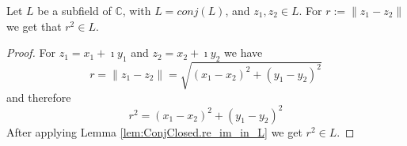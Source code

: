 \begin{lemma}
    \label{lem:ConjClosed.distSq_L}
    \leanok
    Let $L$ be a subfield of $\mathbb{C}$, with $L = conj(L)$, and $z_1, z_2 \in L$.
    For $r := \|z_1-z_2\|$ we get that $r^2 \in L$.
\end{lemma}
\begin{proof}
    \leanok
    For $z_1 = x_1 + \imath y_1$ and $z_2 = x_2 + \imath y_2$ we have
    \begin{equation*}
        r = \|z_1 - z_2\| = \sqrt{(x_1 - x_2)^2 + (y_1 - y_2)^2}
    \end{equation*}
    and therefore
    \begin{equation*}
        r^2 = (x_1 - x_2)^2 + (y_1 - y_2)^2 
    \end{equation*}
    After applying Lemma \ref{lem:ConjClosed.re_im_in_L} we get $r^2 \in L$.
\end{proof}

